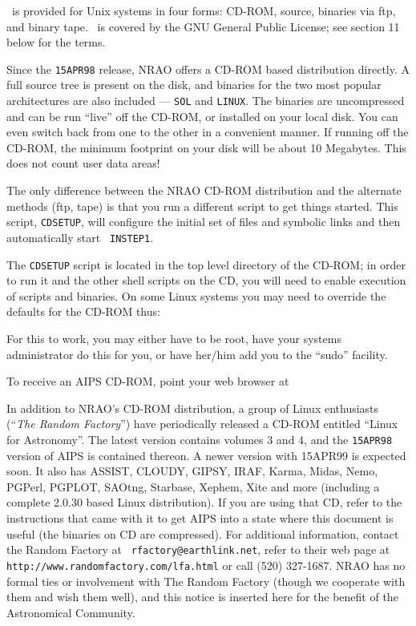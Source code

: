 \medskip{}

\AIPS\ is provided for Unix systems in four forms: CD-ROM, source,
binaries via ftp, and binary tape.  \AIPS\ is covered by the GNU General
Public License; see section 11
below for the terms.

\medskip{}

Since the {\tt 15APR98} release, NRAO offers a CD-ROM based distribution
directly.  A full source tree is present on the disk, and binaries for
the two most popular architectures are also included --- {\tt SOL} and
{\tt LINUX}.  The binaries are uncompressed and can be run ``live'' off
the CD-ROM, or installed on your local disk.  You can even switch back
from one to the other in a convenient manner.  If running off the CD-ROM,
the minimum footprint on your disk will be about 10 Megabytes.  This
does not count user data areas!

The only difference between the NRAO CD-ROM distribution and the
alternate methods (ftp, tape) is that you run a different script to get
things started.  This script, {\tt CDSETUP}, will configure the initial
set of files and symbolic links and then automatically start {\tt
INSTEP1}.

The {\tt CDSETUP} script is located in the top level directory of the
CD-ROM; in order to run it and the other shell scripts on the CD, you
will need to enable execution of scripts and binaries.  On some Linux
systems you may need to override the defaults for the CD-ROM thus:
\medskip
{}\medskip

\noindent For this to work, you may either have to be root, have your
systems administrator do this for you, or have her/him add you to the
``sudo'' facility.

To receive an AIPS CD-ROM, point your web browser at\medskip
{}\medskip

\noindent
In addition to NRAO's CD-ROM distribution, a group of Linux enthusiasts
(``{\it The Random Factory\/}'') have periodically released a CD-ROM
entitled ``Linux for Astronomy''.  The latest version contains volumes 3
and 4, and the {\tt 15APR98} version of AIPS is contained thereon.  A
newer version with 15APR99 is expected soon.
It also has ASSIST, CLOUDY, GIPSY, {\aipsfont IRAF}, Karma, Midas, Nemo,
PGPerl, PGPLOT, SAOtng, Starbase, Xephem, Xite and more (including a
complete 2.0.30 based Linux distribution).  If you are using that CD,
refer to the instructions that came with it to get AIPS into a state
where this document is useful (the binaries on CD are compressed).  For
additional information, contact the Random Factory at {\tt
{rfactory}@earthlink.net}, refer to their web page at {\tt
http://www.randomfactory.com/lfa.html} or call (520) 327-1687.  NRAO has
no formal ties or involvement with The Random Factory (though we
cooperate with them and wish them well), and this notice is inserted
here for the benefit of the Astronomical Community.

